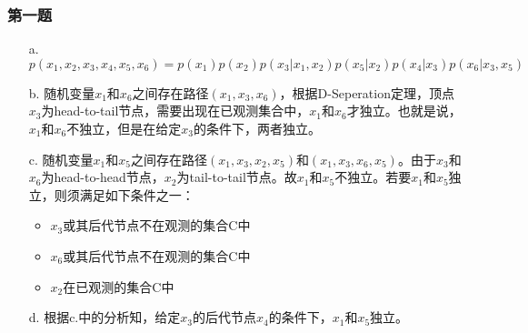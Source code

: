 \documentclass{article}
\date{\today}
\begin{document}
\makecover

\subsubsection*{第一题}
\begin{itemize}
\item[a.]
$p(x_1, x_2, x_3, x_4, x_5, x_6) = p(x_1)p(x_2)p(x_3 | x_1,x_2)p(x_5 | x_2)p(x_4 | x_3)p(x_6 | x_3, x_5) $

\item[b.]
随机变量$x_1$和$x_6$之间存在路径$(x_1 , x_3, x_6)$，根据D-Seperation定理，顶点$x_3$为head-to-tail节点，需要出现在已观测集合中，$x_1$和$x_6$才独立。也就是说，$x_1$和$x_6$不独立，但是在给定$x_3$的条件下，两者独立。

\item[c.]
随机变量$x_1$和$x_5$之间存在路径$(x_1, x_3, x_2, x_5)$和$(x_1, x_3, x_6, x_5)$。由于$x_3$和$x_6$为head-to-head节点，$x_2$为tail-to-tail节点。故$x_1$和$x_5$不独立。若要$x_1$和$x_5$独立，则须满足如下条件之一：
\begin{itemize}
\item $x_3$或其后代节点不在观测的集合C中
\item $x_6$或其后代节点不在观测的集合C中
\item $x_2$在已观测的集合C中
\end{itemize}
\item[d.]
根据c.中的分析知，给定$x_3$的后代节点$x_4$的条件下，$x_1$和$x_5$独立。

\end{itemize}
\end{document}
